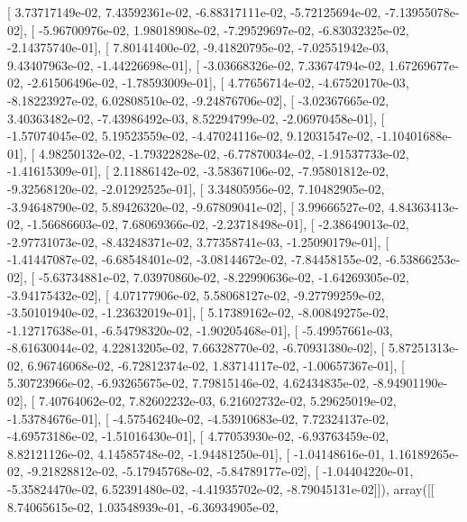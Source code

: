 \documentclass{article}
\begin{document}
       [  3.73717149e-02,   7.43592361e-02,  -6.88317111e-02,
         -5.72125694e-02,  -7.13955078e-02],
       [ -5.96700976e-02,   1.98018908e-02,  -7.29529697e-02,
         -6.83032325e-02,  -2.14375740e-01],
       [  7.80141400e-02,  -9.41820795e-02,  -7.02551942e-03,
          9.43407963e-02,  -1.44226698e-01],
       [ -3.03668326e-02,   7.33674794e-02,   1.67269677e-02,
         -2.61506496e-02,  -1.78593009e-01],
       [  4.77656714e-02,  -4.67520170e-03,  -8.18223927e-02,
          6.02808510e-02,  -9.24876706e-02],
       [ -3.02367665e-02,   3.40363482e-02,  -7.43986492e-03,
          8.52294799e-02,  -2.06970458e-01],
       [ -1.57074045e-02,   5.19523559e-02,  -4.47024116e-02,
          9.12031547e-02,  -1.10401688e-01],
       [  4.98250132e-02,  -1.79322828e-02,  -6.77870034e-02,
         -1.91537733e-02,  -1.41615309e-01],
       [  2.11886142e-02,  -3.58367106e-02,  -7.95801812e-02,
         -9.32568120e-02,  -2.01292525e-01],
       [  3.34805956e-02,   7.10482905e-02,  -3.94648790e-02,
          5.89426320e-02,  -9.67809041e-02],
       [  3.99666527e-02,   4.84363413e-02,  -1.56686603e-02,
          7.68069366e-02,  -2.23718498e-01],
       [ -2.38649013e-02,  -2.97731073e-02,  -8.43248371e-02,
          3.77358741e-03,  -1.25090179e-01],
       [ -1.41447087e-02,  -6.68548401e-02,  -3.08144672e-02,
         -7.84458155e-02,  -6.53866253e-02],
       [ -5.63734881e-02,   7.03970860e-02,  -8.22990636e-02,
         -1.64269305e-02,  -3.94175432e-02],
       [  4.07177906e-02,   5.58068127e-02,  -9.27799259e-02,
         -3.50101940e-02,  -1.23632019e-01],
       [  5.17389162e-02,  -8.00849275e-02,  -1.12717638e-01,
         -6.54798320e-02,  -1.90205468e-01],
       [ -5.49957661e-03,  -8.61630044e-02,   4.22813205e-02,
          7.66328770e-02,  -6.70931380e-02],
       [  5.87251313e-02,   6.96746068e-02,  -6.72812374e-02,
          1.83714117e-02,  -1.00657367e-01],
       [  5.30723966e-02,  -6.93265675e-02,   7.79815146e-02,
          4.62434835e-02,  -8.94901190e-02],
       [  7.40764062e-02,   7.82602232e-03,   6.21602732e-02,
          5.29625019e-02,  -1.53784676e-01],
       [ -4.57546240e-02,  -4.53910683e-02,   7.72324137e-02,
         -4.69573186e-02,  -1.51016430e-01],
       [  4.77053930e-02,  -6.93763459e-02,   8.82121126e-02,
          4.14585748e-02,  -1.94481250e-01],
       [ -1.04148616e-01,   1.16189265e-02,  -9.21828812e-02,
         -5.17945768e-02,  -5.84789177e-02],
       [ -1.04404220e-01,  -5.35824470e-02,   6.52391480e-02,
         -4.41935702e-02,  -8.79045131e-02]]), array([[  8.74065615e-02,   1.03548939e-01,  -6.36934905e-02,
\end{document}
